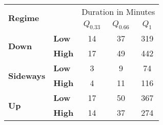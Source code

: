 \centering
\begin{tabular}{ll|ccc}
    \toprule
    \multicolumn{2}{l|}{\multirow{2}{*}{\textbf{Regime}}} & \multicolumn{3}{c}{Duration in Minutes} \\
    \multicolumn{2}{l|}{} & $Q_{0.33}$ & $Q_{0.66}$ & $Q_{1}$ \\
    \midrule
    \multirow{2}{*}{\textbf{Down}}     & \textbf{Low}  & 14 & 37 & 319 \\
    & \textbf{High} & 17 & 49 & 442 \\
    \midrule
    \multirow{2}{*}{\textbf{Sideways}} & \textbf{Low}  & 3  & 9  & 74  \\
    & \textbf{High} & 4  & 11 & 116 \\
    \midrule
    \multirow{2}{*}{\textbf{Up}}       & \textbf{Low}  & 17 & 50 & 367 \\
    & \textbf{High} & 14 & 37 & 274 \\
    \bottomrule
\end{tabular}